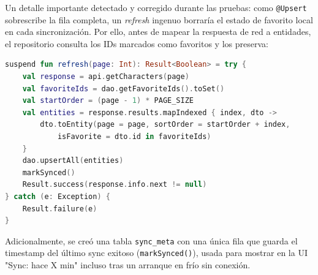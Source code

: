 \documentclass{article}
\begin{document}
	Un detalle importante detectado y corregido durante las pruebas: como \texttt{@Upsert} sobrescribe la fila completa, un \textit{refresh} ingenuo borraría el estado de favorito local en cada sincronización. Por ello, antes de mapear la respuesta de red a entidades, el repositorio consulta los IDs marcados como favoritos y los preserva:
	\begin{lstlisting}[language=Kotlin,caption={CharacterRepository.kt -- preservacion de estado local al sincronizar}]
suspend fun refresh(page: Int): Result<Boolean> = try {
    val response = api.getCharacters(page)
    val favoriteIds = dao.getFavoriteIds().toSet()
    val startOrder = (page - 1) * PAGE_SIZE
    val entities = response.results.mapIndexed { index, dto ->
        dto.toEntity(page = page, sortOrder = startOrder + index,
            isFavorite = dto.id in favoriteIds)
    }
    dao.upsertAll(entities)
    markSynced()
    Result.success(response.info.next != null)
} catch (e: Exception) {
    Result.failure(e)
}
	\end{lstlisting}
	Adicionalmente, se creó una tabla \texttt{sync\_meta} con una única fila que guarda el timestamp del último sync exitoso (\texttt{markSynced()}), usada para mostrar en la UI "Sync: hace X min" incluso tras un arranque en frío sin conexión.
\end{document}
